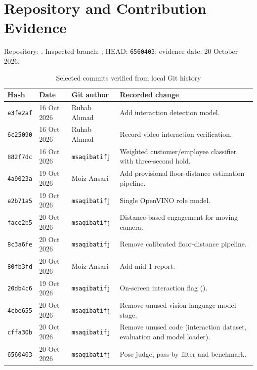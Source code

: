 \chapter{Repository and Contribution Evidence}
\label{app:repo}
Repository: . Inspected branch: ; HEAD: \texttt{6560403}; evidence date: 20 October 2026.

\begin{longtable}{P{0.13\textwidth}P{0.16\textwidth}P{0.18\textwidth}P{0.41\textwidth}}
\caption{Selected commits verified from local Git history}\\
\toprule
Hash & Date & Git author & Recorded change\\
\midrule
\endhead
\texttt{e3fe2af} & 16 Oct 2026 & Ruhab Ahmad & Add interaction detection model.\\
\texttt{6c25090} & 16 Oct 2026 & Ruhab Ahmad & Record video interaction verification.\\
\texttt{882f7dc} & 16 Oct 2026 & \texttt{msaqibatifj} & Weighted customer/employee classifier with three-second hold.\\
\texttt{4a9023a} & 19 Oct 2026 & Moiz Ansari & Add provisional floor-distance estimation pipeline.\\
\texttt{e2b71a5} & 19 Oct 2026 & \texttt{msaqibatifj} & Single OpenVINO role model.\\
\texttt{face2b5} & 20 Oct 2026 & \texttt{msaqibatifj} & Distance-based engagement for moving camera.\\
\texttt{8c3a6fe} & 20 Oct 2026 & \texttt{msaqibatifj} & Remove calibrated floor-distance pipeline.\\
\texttt{80fb3fd} & 20 Oct 2026 & Moiz Ansari & Add mid-1 report.\\
\texttt{20db4c6} & 19 Oct 2026 & \texttt{msaqibatifj} & On-screen interaction flag ().\\
\texttt{4cbe655} & 20 Oct 2026 & \texttt{msaqibatifj} & Remove unused vision-language-model stage.\\
\texttt{cffa30b} & 20 Oct 2026 & \texttt{msaqibatifj} & Remove unused code (interaction dataset, evaluation and model loader).\\
\texttt{6560403} & 20 Oct 2026 & \texttt{msaqibatifj} & Pose judge, pass-by filter and benchmark.\\
\bottomrule
\end{longtable}

